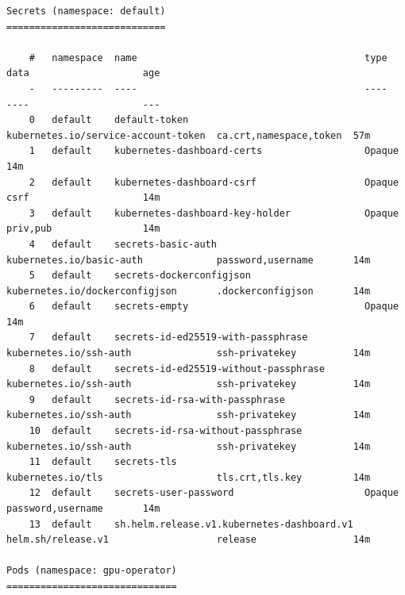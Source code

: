 \begin{code}
\label{code:apx:a:yaml}
\begin{verbatim}
Secrets (namespace: default)
============================

    #   namespace  name                                        type                                 data                    age
    -   ---------  ----                                        ----                                 ----                    ---
    0   default    default-token                               kubernetes.io/service-account-token  ca.crt,namespace,token  57m
    1   default    kubernetes-dashboard-certs                  Opaque                                                       14m
    2   default    kubernetes-dashboard-csrf                   Opaque                               csrf                    14m
    3   default    kubernetes-dashboard-key-holder             Opaque                               priv,pub                14m
    4   default    secrets-basic-auth                          kubernetes.io/basic-auth             password,username       14m
    5   default    secrets-dockerconfigjson                    kubernetes.io/dockerconfigjson       .dockerconfigjson       14m
    6   default    secrets-empty                               Opaque                                                       14m
    7   default    secrets-id-ed25519-with-passphrase          kubernetes.io/ssh-auth               ssh-privatekey          14m
    8   default    secrets-id-ed25519-without-passphrase       kubernetes.io/ssh-auth               ssh-privatekey          14m
    9   default    secrets-id-rsa-with-passphrase              kubernetes.io/ssh-auth               ssh-privatekey          14m
    10  default    secrets-id-rsa-without-passphrase           kubernetes.io/ssh-auth               ssh-privatekey          14m
    11  default    secrets-tls                                 kubernetes.io/tls                    tls.crt,tls.key         14m
    12  default    secrets-user-password                       Opaque                               password,username       14m
    13  default    sh.helm.release.v1.kubernetes-dashboard.v1  helm.sh/release.v1                   release                 14m

Pods (namespace: gpu-operator)
==============================


\end{verbatim}
\end{code}
